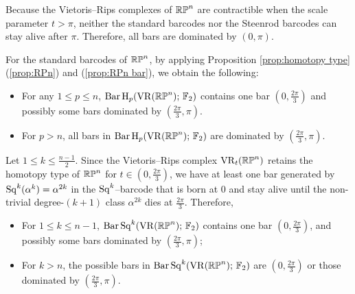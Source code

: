 \subsubsection{} Because the Vietoris--Rips complexes of $\mathbb{RP}^n$ are contractible when the scale parameter $t>\pi$, neither the standard barcodes nor the Steenrod barcodes can stay alive after $\pi$.
Therefore, all bars are dominated by $(0,\pi)$.

For the standard barcodes of $\mathbb{RP}^n$, by applying Proposition \ref{prop:homotopy type} (\ref{prop:RPn}) and (\ref{prop:RPn bar}), %
we obtain the following:
\begin{itemize}
	\item For any $1 \leq p \leq n$, $\operatorname{Bar} \operatorname{H}_{p}(\operatorname{VR}(\mathbb{RP}^n);\,{\mathbb{F}_2})$ contains one bar $(0,\tfrac{2\pi}{3})$ and possibly some bars dominated by $(\tfrac{2\pi}{3}, \pi)$.
	\item For $p>n$, all bars in $\operatorname{Bar} \operatorname{H}_{p}(\operatorname{VR}(\mathbb{RP}^n);\,{\mathbb{F}_2})$ are dominated by $(\tfrac{2\pi}{3},\pi)$.
\end{itemize}


Let $1 \leq k \leq \tfrac{n-1}{2}$.
Since the Vietoris--Rips complex $\operatorname{VR}_t(\mathbb{RP}^n)$ retains the homotopy type of $\mathbb{RP}^n$ for $t \in (0,\tfrac{2\pi}{3})$, we have at least one bar generated by $\operatorname{Sq}^k(\alpha^k)=\alpha^{2k}$ in the $\operatorname{Sq}^k$--barcode that is born at $0$ and stay alive until the non-trivial degree-$(k+1)$ class $\alpha^{2k}$ dies at $\tfrac{2\pi}{3}$.
Therefore,
\begin{itemize}
	\item For $1\leq k\leq n-1$, $\operatorname{Bar}\operatorname{Sq}^{k}(\operatorname{VR}(\mathbb{RP}^n);\,{\mathbb{F}_2})$ contains one bar $(0,\tfrac{2\pi}{3})$, and possibly some bars dominated by $(\tfrac{2\pi}{3},\pi)$;
	\item For $k>n$, the possible bars in $\operatorname{Bar}\operatorname{Sq}^{k}(\operatorname{VR}(\mathbb{RP}^n);\,{\mathbb{F}_2})$ are $(0,\tfrac{2\pi}{3})$ or those dominated by $(\tfrac{2\pi}{3},\pi)$.
\end{itemize}


